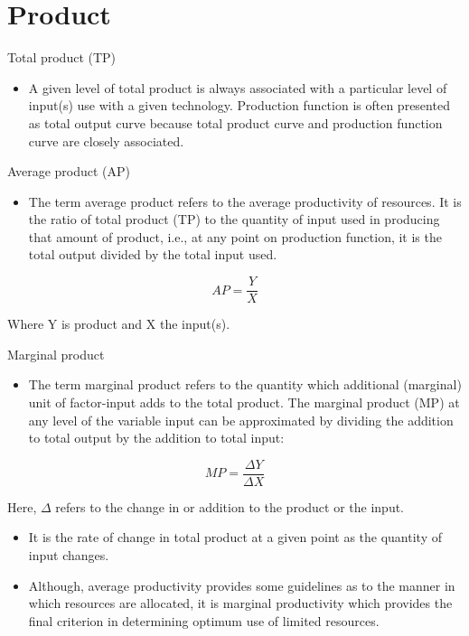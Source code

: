 \documentclass[12pt,ignorenonframetext,aspectratio=169]{beamer}
\providecommand{\tightlist}{%
  \setlength{\itemsep}{0pt}\setlength{\parskip}{0pt}}
\begin{document}
\hypertarget{product}{%
\section{Product}\label{product}}

\begin{frame}{Total product (TP)}
\protect\hypertarget{total-product-tp}{}

\begin{itemize}
\tightlist
\item
  A given level of total product is always associated with a particular
  level of input(s) use with a given technology. Production function is
  often presented as total output curve because total product curve and
  production function curve are closely associated.
\end{itemize}

\end{frame}

\begin{frame}{Average product (AP)}
\protect\hypertarget{average-product-ap}{}

\begin{itemize}
\tightlist
\item
  The term average product refers to the average productivity of
  resources. It is the ratio of total product (TP) to the quantity of
  input used in producing that amount of product, i.e., at any point on
  production function, it is the total output divided by the total input
  used.
\end{itemize}

\[
AP = \frac{Y}{X}
\]

Where Y is product and X the input(s).

\end{frame}

\begin{frame}{Marginal product}
\protect\hypertarget{marginal-product}{}

\begin{itemize}
\tightlist
\item
  The term marginal product refers to the quantity which additional
  (marginal) unit of factor-input adds to the total product. The
  marginal product (MP) at any level of the variable input can be
  approximated by dividing the addition to total output by the addition
  to total input:
\end{itemize}

\[
MP = \frac{\Delta Y}{\Delta X}
\]

Here, \(\Delta\) refers to the change in or addition to the product or
the input.

\begin{itemize}
\tightlist
\item
  It is the rate of change in total product at a given point as the
  quantity of input changes.
\item
  Although, average productivity provides some guidelines as to the
  manner in which resources are allocated, it is marginal productivity
  which provides the final criterion in determining optimum use of
  limited resources.
\end{itemize}

\end{frame}
\end{document}
